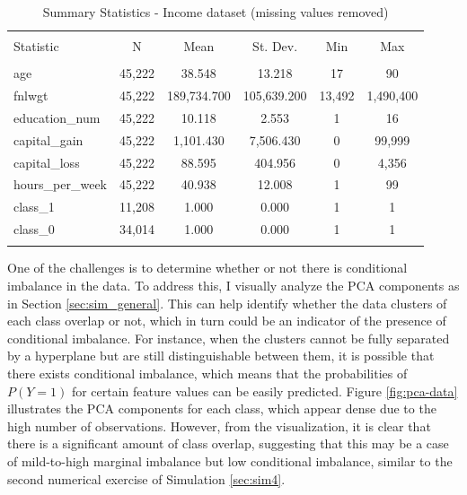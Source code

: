 \begin{table}[ht] \centering 
\begin{tabular}{@{\extracolsep{5pt}}lccccc} 
\\[-1.8ex]\hline 
\hline \\[-1.8ex] 
Statistic & \multicolumn{1}{c}{N} & \multicolumn{1}{c}{Mean} & \multicolumn{1}{c}{St. Dev.} & \multicolumn{1}{c}{Min} & \multicolumn{1}{c}{Max} \\ 
\hline \\[-1.8ex] 
age & 45,222 & 38.548 & 13.218 & 17 & 90 \\ 
fnlwgt & 45,222 & 189,734.700 & 105,639.200 & 13,492 & 1,490,400 \\ 
education\_num & 45,222 & 10.118 & 2.553 & 1 & 16 \\ 
capital\_gain & 45,222 & 1,101.430 & 7,506.430 & 0 & 99,999 \\ 
capital\_loss & 45,222 & 88.595 & 404.956 & 0 & 4,356 \\ 
hours\_per\_week & 45,222 & 40.938 & 12.008 & 1 & 99 \\ 
class\_1 & 11,208 & 1.000 & 0.000 & 1 & 1 \\ 
class\_0 & 34,014 & 1.000 & 0.000 & 1 & 1 \\ 
\hline \\[-1.8ex] 
\end{tabular} 
\caption{Summary Statistics - Income dataset (missing values removed)} 
\label{tab:data-summary}
\end{table} 

One of the challenges is to determine whether or not there is conditional imbalance in the data. To address this, I visually analyze the PCA components as in Section \ref{sec:sim_general}. This can help identify whether the data clusters of each class overlap or not, which in turn could be an indicator of the presence of conditional imbalance. For instance, when the clusters cannot be fully separated by a hyperplane but are still distinguishable between them, it is possible that there exists conditional imbalance, which means that the probabilities of $P(Y=1)$ for certain feature values can be easily predicted. Figure \ref{fig:pca-data} illustrates the PCA components for each class, which appear dense due to the high number of observations. However, from the visualization, it is clear that there is a significant amount of class overlap, suggesting that this may be a case of mild-to-high marginal imbalance but low conditional imbalance, similar to the second numerical exercise of Simulation \ref{sec:sim4}.



